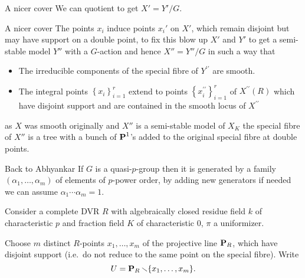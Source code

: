 \begin{frame}{A nicer cover}
        We can quotient to get $X' = Y'/G$.
    \end{frame}\begin{frame}{A nicer cover}
        The points $x_i$ induce points $x_i'$ on $X'$, which remain disjoint but may have support on a double point, to fix this blow up $X'$ and $Y'$ to get a semi-stable model $Y''$  with  a $G$-action and hence $X''=Y''/G$ in such a way that
        \begin{itemize}
            \item The irreducible components of the special fibre of $Y^{\prime \prime}$ are smooth.
            \item The integral points $\left\{x_{i}\right\}_{i=1}^{r}$ extend to points $\left\{x_{i}^{\prime \prime}\right\}_{i=1}^{r}$ of $X^{\prime \prime}(R)$ which have disjoint support and are contained in the smooth locus of $X^{\prime \prime}$
        \end{itemize}

        as $X$ was smooth originally and $X''$ is a semi-stable model of $X_K$ the special fibre of $X''$ is a tree with a bunch of $\operatorname{\mathbf {P}}^1$'s added to the original special fibre at double points.

\end{frame}






\begin{frame}{Back to Abhyankar}
    If $G$ is a quasi-$p$-group then it is generated by a family $(\alpha _1, \ldots, \alpha _m)$ of elements of $p$-power order, by adding new generators if needed we can assume $\alpha _1 \cdots \alpha _m = 1$.


    Consider a complete DVR $R$ with algebraically closed residue field $k$ of characteristic $p$ and fraction field $K$ of characteristic $0$, $\pi $ a uniformizer.

    Choose $m$ distinct $R$-points $x_1, \ldots, x_m$ of the projective line $\operatorname{\mathbf {P}}_R$, which have disjoint support (i.e.\ do not reduce to the same point on the special fibre).
    Write $$U = \operatorname{\mathbf {P}}_R\smallsetminus \{x_1, \ldots, x_m\}.$$

\end{frame}

